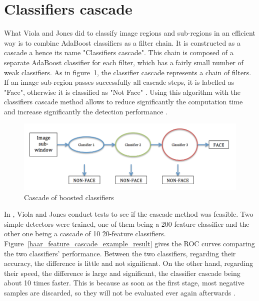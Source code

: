 \section{Classifiers cascade}

\vspace{\baselineskip}
\noindent What Viola and Jones did to classify image regions and sub-regions in an efficient way is to combine AdaBoost classifiers as a filter chain. It is constructed as a cascade a hence its name  "Classifiers cascade". This chain is composed of a separate AdaBoost classifier for each filter, which has a fairly small number of weak classifiers. As in figure~\ref{haar_feature_cascade}, the classifier cascade represents a chain of filters. If an image sub-region passes successfully all cascade steps, it is labelled as "Face", otherwise it is classified as "Not Face" \cite{HEW07}. Using this algorithm with the classifiers cascade method allows to reduce significantly the computation time and increase significantly the detection performance \cite{VIO01}.
\newline

\begin{figure}[!h]
\begin{center}
\noindent \includegraphics[scale=0.5]{figures/haar_feature_cascade} 
\newline
\caption{Cascade of boosted classifiers}
\label{haar_feature_cascade}
\end{center} 
\end{figure}

\noindent In \cite{VIO01}, Viola and Jones conduct tests to see if the cascade method was feasible. Two simple detectors were trained, one of them being a 200-feature classifier and the other one being a cascade of 10 20-feature classifiers. Figure~\ref{haar_feature_cascade_example_result} gives the ROC curves comparing the two classifiers' performance. Between the two classifiers, regarding their accuracy, the difference is little and not significant. On the other hand, regarding their speed, the difference is large and significant, the classifier cascade being about 10 times faster. This is because as soon as the first stage, most negative samples are discarded, so they will not be evaluated ever again afterwards \cite{VIO01}.
\newline

